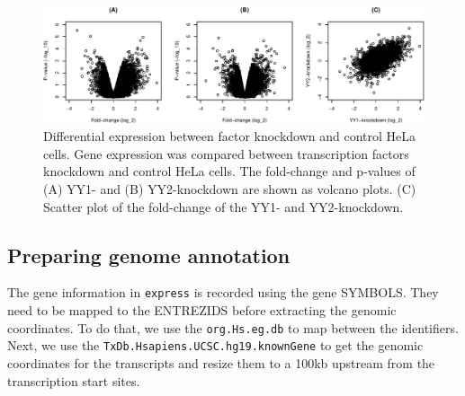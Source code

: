 \documentclass[9pt,a4paper,]{extarticle}
\begin{document}
\begin{figure}

{\centering \includegraphics[width=1\linewidth]{targetFlow_files/figure-latex/foldchange-1} 

}

\caption{Differential expression between factor knockdown and control HeLa cells. Gene expression was compared between transcription factors knockdown and control HeLa cells. The fold-change and p-values of (A) YY1- and (B) YY2-knockdown are shown as volcano plots. (C) Scatter plot of the fold-change of the YY1- and YY2-knockdown.}\label{fig:foldchange}
\end{figure}

\hypertarget{preparing-genome-annotation}{%
\subsection{Preparing genome annotation}\label{preparing-genome-annotation}}

The gene information in \texttt{express} is recorded using the gene SYMBOLS. They need to be mapped to the ENTREZIDS before extracting the genomic coordinates. To do that, we use the \texttt{org.Hs.eg.db} to map between the identifiers. Next, we use the \texttt{TxDb.Hsapiens.UCSC.hg19.knownGene} to get the genomic coordinates for the transcripts and resize them to a 100kb upstream from the transcription start sites.
\end{document}
